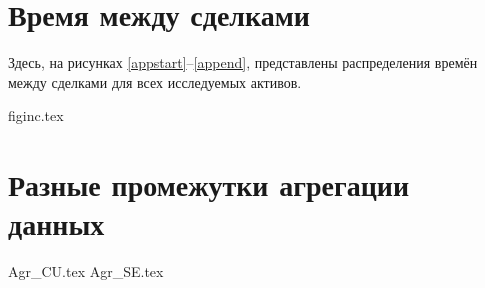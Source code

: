 \begin{appendices}


	\section{Время между сделками} \label{timedistr}
	Здесь, на рисунках \ref{appstart}--\ref{append}, представлены распределения времён между сделками для всех исследуемых активов.

	{figinc.tex}

	\section{Разные промежутки агрегации данных} \label{aggrnot1}

	{Agr_CU.tex}
	{Agr_SE.tex}




\end{appendices}   %